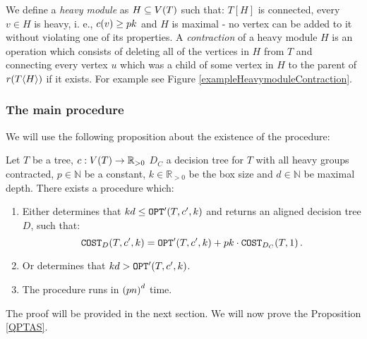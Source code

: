 
We define a \textit{heavy module} as $H\subseteq V\mathopen{}\left( T \right)$ such that: $T[H]$ is connected, every $v \in H$ is heavy, i. e., $c\mathopen{}\left( v \right)\geq pk$ and $H$ is maximal - no vertex can be added to it without violating one of its properties. A \textit{contraction} of a heavy module $H$ is an operation which consists of deleting all of the vertices in $H$ from $T$ and connecting every vertex $u$ which was a child of some vertex in $H$ to the parent of $r\mathopen{}\left( T\mathopen{}\langle H \rangle \right)$ if it exists. For example see Figure \ref{exampleHeavymoduleContraction}.

\subsubsection{The main procedure}

We will use the following proposition about the existence of the \FBuildDT procedure:
\begin{proposition}\label{BuildDTPropodisition}
     Let $T$ be a tree, $c:V\mathopen{}\left( T \right)\to \mathbb{R}_{>0}$ $D_C$ a decision tree for $T$ with all heavy groups contracted, $p\in \mathbb{N}$ be a constant, $k\in \mathbb{R}_{>0}$ be the box size and $d\in \mathbb{N}$ be maximal depth. There exists a \FBuildDT procedure which:
     \begin{enumerate}
        \item Either determines that $kd\leq \texttt{OPT}'\mathopen{}\left( T, c',k \right)$ and returns an aligned decision tree $D$, such that:
        $$
            \texttt{COST}_{D}\mathopen{}\left( T,c',k \right)=\texttt{OPT}'\mathopen{}\left( T,c',k \right)+pk\cdot \texttt{COST}_{D_C}\mathopen{}\left( T,1 \right).
        $$
        \item Or determines that $kd > \texttt{OPT}'\mathopen{}\left( T, c',k \right)$.
        \item The procedure runs in $\mathopen{}\left( pn \right)^d$ time.
     \end{enumerate}
\end{proposition}
The proof will be provided in the next section.
We will now prove the Proposition \ref{QPTAS}.



